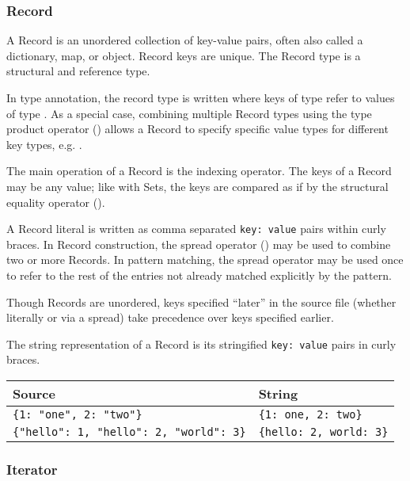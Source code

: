 \subsubsection{Record}

A Record is an unordered collection of key-value pairs, often also called
a dictionary, map, or object. Record keys are unique. The Record type is a
structural and reference type.

In type annotation, the record type is written  where keys of
type  refer to values of type . As a special case, combining
multiple Record types using the type product operator (\op{\&}) allows a Record
to specify specific value types for different key types, e.g.
.

The main operation of a Record is the indexing operator. The keys of a
Record may be any value; like with Sets, the keys are compared as if by
the structural equality operator (\op{==}).

A Record literal is written as comma separated \texttt{key: value} pairs
within curly braces. In Record construction, the spread operator ()
may be used to combine two or more Records. In pattern matching, the spread
operator may be used once to refer to the rest of the entries not already
matched explicitly by the pattern.

Though Records are unordered, keys specified ``later'' in the source file
(whether literally or via a spread) take precedence over keys specified
earlier.

The string representation of a Record is its stringified \texttt{key: value}
pairs in curly braces.

\begin{table}[H]
    \centering
    \begin{tabular}{ll}
        \hline
        \textbf{Source} & \textbf{String} \\
        \hline
        \texttt{\{1: "one", 2: "two"\}} & \texttt{\{1: one, 2: two\}} \\
        \texttt{\{"hello": 1, "hello": 2, "world": 3\}} & \texttt{\{hello: 2, world: 3\}} \\
        \hline
    \end{tabular}
\end{table}

\subsubsection{Iterator}
\label{sec:iterators}

